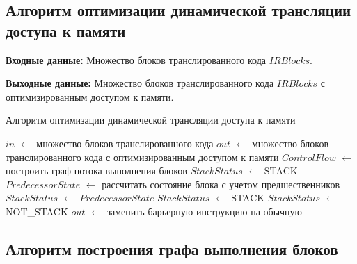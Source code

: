 \subsection{Алгоритм оптимизации динамической трансляции доступа к памяти}

\textbf{Входные данные:} Множество блоков транслированного кода $IRBlocks$.

\textbf{Выходные данные:} Множество блоков транслированного кода $IRBlocks$ с оптимизированным доступом к памяти.

\begin{algorithm}[H]
\small
	\caption{Алгоритм оптимизации динамической трансляции доступа к памяти}
	\label{alg:memopt}
	\begin{algorithmic}[1]
		\State $in$ $\gets$ множество блоков транслированного кода
		\State $out$ $\gets$ множество блоков транслированного кода с оптимизированным доступом к памяти
		\State $ControlFlow$ $\gets$ построить граф потока выполнения блоков
		\State $StackStatus$ $\gets$ STACK
		\State $PredecessorState$ $\gets$ рассчитать состояние блока с учетом предшественников
		\State $StackStatus$ $\gets$ $PredecessorState$
		\EndIf
		\EndFor
		\State $StackStatus$ $\gets$ STACK
		\EndIf
		\State $StackStatus$ $\gets$ NOT\_STACK
		\EndIf
		\State $out$ $\gets$ заменить барьерную инструкцию на обычную
		\EndIf
		\EndFor
		\EndFor
	\end{algorithmic}
\end{algorithm}


\subsection{Алгоритм построения графа выполнения блоков}

